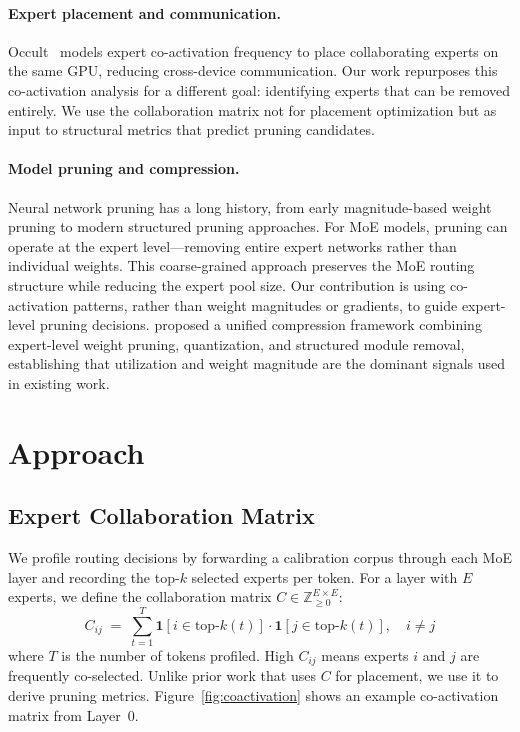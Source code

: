 \documentclass{article}
\begin{document}
\paragraph{Expert placement and communication.}
Occult~\citep{luo2025occult} models expert co-activation frequency to place
collaborating experts on the same GPU, reducing cross-device communication.
Our work repurposes this co-activation analysis for a different goal: identifying
experts that can be removed entirely.
We use the collaboration matrix not for placement optimization but as input to
structural metrics that predict pruning candidates.

\paragraph{Model pruning and compression.}
Neural network pruning has a long history, from early magnitude-based weight
pruning to modern structured pruning approaches.
For MoE models, pruning can operate at the expert level---removing entire expert
networks rather than individual weights.
This coarse-grained approach preserves the MoE routing structure while reducing
the expert pool size.
Our contribution is using co-activation patterns, rather than weight magnitudes
or gradients, to guide expert-level pruning decisions.
\citet{he2024demystifying} proposed a unified compression framework
combining expert-level weight pruning, quantization, and structured
module removal, establishing that utilization and weight magnitude
are the dominant signals used in existing work.

\section{Approach}

\subsection{Expert Collaboration Matrix}

We profile routing decisions by forwarding a calibration corpus through each MoE layer
and recording the top-$k$ selected experts per token.
For a layer with $E$ experts, we define the collaboration matrix
$C \in \mathbb{Z}_{\geq 0}^{E \times E}$:
\begin{equation}
    C_{ij} \;=\; \sum_{t=1}^{T}
        \mathbf{1}\!\left[i \in \mathrm{top\text{-}}k(t)\right]
        \cdot
        \mathbf{1}\!\left[j \in \mathrm{top\text{-}}k(t)\right],
        \quad i \neq j
    \label{eq:collab}
\end{equation}
where $T$ is the number of tokens profiled.
High $C_{ij}$ means experts $i$ and $j$ are frequently co-selected.
Unlike prior work that uses $C$ for placement, we use it to derive pruning metrics.
Figure~\ref{fig:coactivation} shows an example co-activation matrix from Layer~0.
\end{document}
